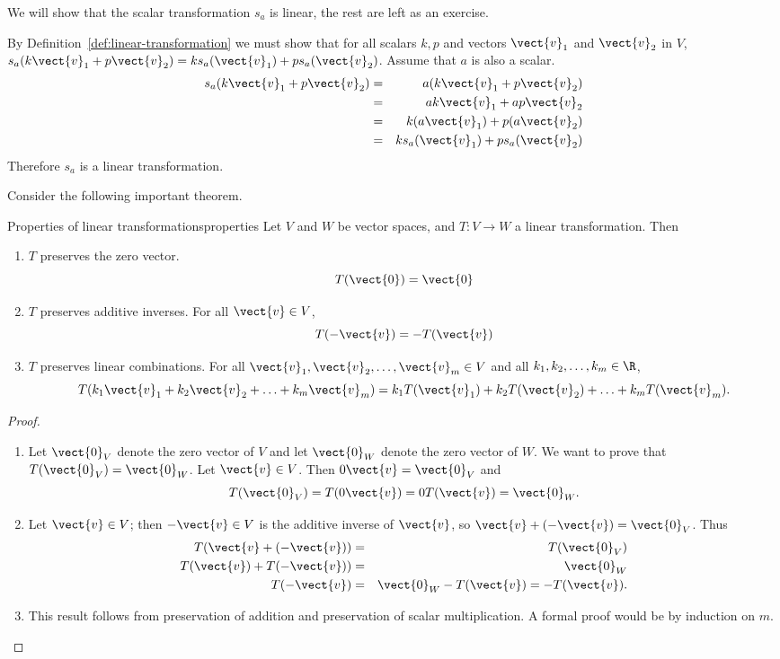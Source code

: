 \begin{solution}
We will show that the scalar transformation $s_a$ is linear, the rest are left as an exercise.

By Definition~\ref{def:linear-transformation} we must show that for all scalars $k ,p $ and
vectors $\vect{v}_1$ and $\vect{v}_2$ in $V$, $s_a(k \vect{v}_1 + p \vect{v}_2) = k s_a(\vect{v}_1)+ p s_a(\vect{v}_{2})$. Assume that $a$ is also a scalar.
\begin{eqnarray*}
s_a(k \vect{v}_1 + p \vect{v}_2) &=& a (k \vect{v}_1 + p \vect{v}_2) \\
&=&  ak \vect{v}_1 + ap \vect{v}_2  \\
 &=&  k (a \vect{v}_1) + p(a \vect{v}_2)  \\
&=& k s_a(\vect{v}_1)  + p s_a (\vect{v}_2)
\end{eqnarray*}
Therefore $s_a$ is a linear transformation.
\end{solution}

Consider the following important theorem.

\begin{theorem}{Properties of linear transformations}{properties}
Let $V$ and $W$ be vector spaces, and $T:V \to W$ a linear
transformation.
Then
\begin{enumerate}
\item $T$ preserves the zero vector.
\[
T(\vect{0})=\vect{0}
\]
\item $T$ preserves additive inverses.
For all $\vect{v}\in V$,
\[
T(-\vect{v})= -T(\vect{v})
\]
\item $T$ preserves linear combinations.
For all $\vect{v}_1, \vect{v}_2, \ldots, \vect{v}_m \in V$ and
all $k_1, k_2, \ldots, k_m\in\R$,
\[ T(k_1\vect{v}_1 + k_2\vect{v}_2 + \ldots + k_m\vect{v}_m)
= k_1T(\vect{v}_1) + k_2T(\vect{v}_2) + \ldots + k_mT(\vect{v}_m).\]
\end{enumerate}
\end{theorem}

\begin{proof}
\begin{enumerate}
\item Let $\vect{0}_V$ denote the zero vector of $V$ and let
$\vect{0}_W$ denote the zero vector of $W$.
We want to prove that $T(\vect{0}_V)=\vect{0}_W$.
Let $\vect{v}\in V$.
Then $0\vect{v}=\vect{0}_V$ and
\[ T(\vect{0}_V)=T(0\vect{v})=0T(\vect{v})=\vect{0}_W.\]
\item
Let $\vect{v}\in V$; then $-\vect{v}\in V$ is the additive
inverse of $\vect{v}$, so $\vect{v} + (-\vect{v})=\vect{0}_V$.
Thus
\begin{eqnarray*}
T(\vect{v} + (-\vect{v})) & = & T(\vect{0}_V) \\
T(\vect{v}) + T(-\vect{v})) & = & \vect{0}_W \\
T(-\vect{v}) & = & \vect{0}_W - T(\vect{v}) =  - T(\vect{v}).
\end{eqnarray*}
\item This result follows from
preservation of addition and preservation of scalar multiplication.
A formal proof would be by induction on $m$.
\end{enumerate}
\end{proof}

